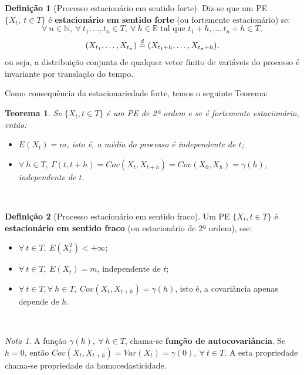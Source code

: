 \documentclass[
  11pt,
  a4paper,
]{book}
\newtheorem{theorem}{Teorema}[chapter]
\theoremstyle{definition}
\newtheorem{definition}{Definição}[chapter]
\theoremstyle{definition}
\theoremstyle{definition}
\theoremstyle{definition}
\theoremstyle{remark}
\newtheorem*{remark}{Nota }
\begin{document}
\begin{definition}[Processo estacionário em sentido forte]
Diz-se que um PE \(\{X_t,~ t \in T\}\) é \textbf{estacionário em sentido forte} (ou fortemente estacionário) se:
\[\forall~n \in \mathbb{N},~ \forall~t_1, \ldots, t_n \in T,~ \forall~h \in \mathbb{R} \text{ tal que } t_1 + h, \ldots, t_n + h \in T,\]
\[(X_{t_1}, \ldots, X_{t_n}) \buildrel d \over = (X_{t_1+h}, \ldots, X_{t_n+h}),\]
ou seja, a distribuição conjunta de qualquer vetor finito de variáveis do processo é invariante por translação do tempo.
\end{definition}

Como consequência da estacionariedade forte, temos o seguinte Teorema:

\begin{theorem}

Se \(\{X_t, t \in T\}\) é um PE de 2ª ordem e se é fortemente estacionário, então:

\begin{itemize}
\item
  \(E(X_t)=m\), isto é, a média do processo é independente de \(t\);
\item
  \(\forall ~h \in T, ~ \Gamma(t,t+h)=Cov(X_t,X_{t+h})=Cov(X_0,X_h)=\gamma(h)\),
  independente de \(t\).
\end{itemize}

\end{theorem}

\(\,\)

\begin{definition}[Processo estacionário em sentido fraco]

Um PE \(\{X_t, t \in T\}\) é \textbf{estacionário em sentido fraco} (ou estacionário de 2ª ordem),
sse:

\begin{itemize}
\item
  \(\forall ~t \in T, ~E(X^2_t)< + \infty\);
\item
  \(\forall ~t \in T, ~E(X_t)=m\), independente de \(t\);
\item
  \(\forall ~t \in T, \forall ~h \in T,  ~Cov(X_t,X_{t+h})=\gamma(h)\), isto é, a covariância
  apenas depende de \(h\).
\end{itemize}

\end{definition}

\(\,\)

\begin{remark}
A função \(\gamma(h), ~\forall ~ h \in T\), chama-se \textbf{função de autocovariância}. Se \(h=0\),
então \(Cov(X_t,X_{t+h})=Var(X_t)=\gamma(0), ~\forall ~t \in T.\) A esta propriedade chama-se
propriedade da homocedasticidade.
\end{remark}
\end{document}
